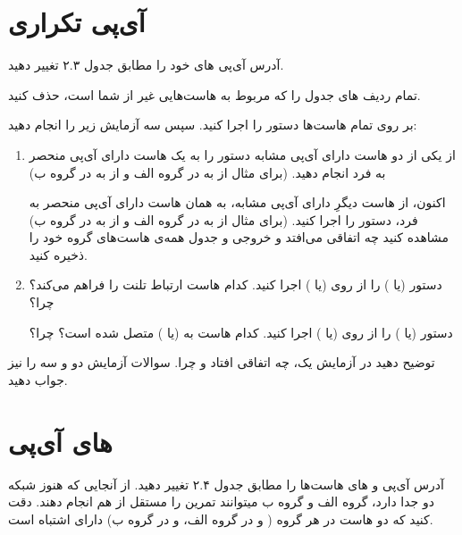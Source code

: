 \documentclass{../UTNetLabFa}
\begin{document}
	\section{آی‌پی تکراری}
	
	آدرس آی‌پی های  خود را مطابق جدول ۲.۳ تغییر دهید.
	
	تمام ردیف های جدول  را که مربوط به هاست‌هایی غیر از  شما است، حذف کنید.
	
	بر روی تمام هاست‌ها دستور  را اجرا کنید. سپس سه آزمایش زیر را انجام دهید:
	
		\begin{enumerate}
		\item 
		از یکی از دو هاست دارای آی‌پی مشابه دستور  را به یک هاست دارای آی‌پی منحصر به فرد انجام دهید. (برای مثال از  به  در گروه الف و از  به  در گروه ب)
		
		 اکنون، از هاست دیگرِ دارای آی‌پی مشابه، به همان هاست دارای آی‌پی منحصر به فرد، دستور  را اجرا کنید. (برای مثال از  به  در گروه الف و از  به  در گروه ب) مشاهده کنید چه اتفاقی می‌افتد و خروجی  و جدول  همه‌ی هاست‌های گروه خود را ذخیره کنید.
		\item
		دستور  (یا ) را از روی  (یا ) اجرا کنید.
		کدام هاست ارتباط تلنت را فراهم می‌کند؟ چرا؟
		
		دستور  (یا ) را از روی  (یا ) اجرا کنید.
		کدام هاست به  (یا ) متصل شده است؟ چرا؟
	\end{enumerate}
	
	
	\begin{report}
	\item
	توضیح دهید در آزمایش یک، چه اتفاقی افتاد و چرا. سوالات آزمایش دو و سه را نیز جواب دهید.
	\end{report}
	
	\section { های آی‌پی}
	
	آدرس آی‌پی و  های هاست‌ها را مطابق جدول ۲.۴ تغییر دهید. از آنجایی که هنوز شبکه دو  جدا دارد، گروه الف و گروه ب میتوانند تمرین را مستقل از هم انجام دهند. دقت کنید که دو هاست در هر گروه ( و  در گروه الف،  و  در گروه ب) دارای  اشتباه است.
	
\end{document}
